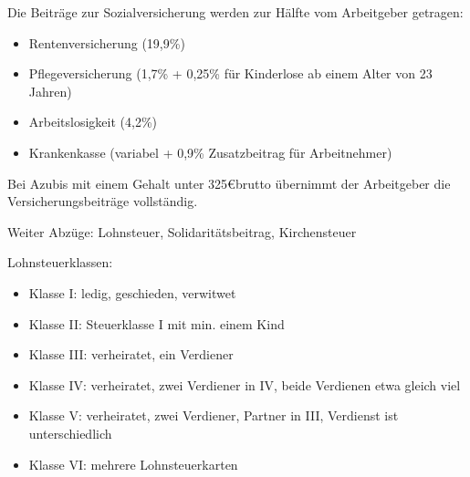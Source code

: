 Die Beiträge zur Sozialversicherung werden zur Hälfte vom Arbeitgeber getragen:
\begin{itemize}
	\item Rentenversicherung (19,9\%)
	\item Pflegeversicherung (1,7\% + 0,25\% für Kinderlose ab einem Alter von 23 Jahren)
	\item Arbeitslosigkeit (4,2\%)
	\item Krankenkasse (variabel + 0,9\% Zusatzbeitrag für Arbeitnehmer)
\end{itemize}
Bei Azubis mit einem Gehalt unter 325\euro brutto übernimmt der Arbeitgeber die Versicherungsbeiträge vollständig.

Weiter Abzüge: Lohnsteuer, Solidaritätsbeitrag, Kirchensteuer

Lohnsteuerklassen:
\begin{itemize}
	\item Klasse I: ledig, geschieden, verwitwet
	\item Klasse II: Steuerklasse I mit min. einem Kind
	\item Klasse III: verheiratet, ein Verdiener
	\item Klasse IV: verheiratet, zwei Verdiener in IV, beide Verdienen etwa gleich viel
	\item Klasse V: verheiratet, zwei Verdiener, Partner in III, Verdienst ist unterschiedlich
	\item Klasse VI: mehrere Lohnsteuerkarten
\end{itemize}

